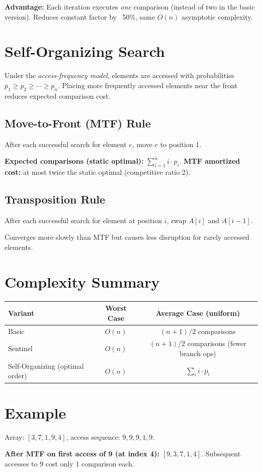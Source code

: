 \documentclass[12pt]{article}
\begin{document}
\textbf{Advantage:} Each iteration executes \emph{one} comparison (instead of two in the basic
version). Reduces constant factor by ~50\%, same $O(n)$ asymptotic complexity.

\section{Self-Organizing Search}

Under the \emph{access-frequency model}, elements are accessed with probabilities
$p_1 \geq p_2 \geq \cdots \geq p_n$. Placing more frequently accessed elements near the front
reduces expected comparison cost.

\subsection*{Move-to-Front (MTF) Rule}
After each successful search for element $e$, move $e$ to position 1.

\textbf{Expected comparisons (static optimal):} $\sum_{i=1}^{n} i \cdot p_i$.
\textbf{MTF amortized cost:} at most twice the static optimal (competitive ratio 2).

\subsection*{Transposition Rule}
After each successful search for element at position $i$, swap $A[i]$ and $A[i-1]$.

Converges more slowly than MTF but causes less disruption for rarely accessed elements.

\section{Complexity Summary}

\begin{center}
\begin{tabular}{lcc}
\toprule
Variant & Worst Case & Average Case (uniform) \\
\midrule
Basic & $O(n)$ & $(n+1)/2$ comparisons \\
Sentinel & $O(n)$ & $(n+1)/2$ comparisons (fewer branch ops) \\
Self-Organizing (optimal order) & $O(n)$ & $\sum_{i} i \cdot p_i$ \\
\bottomrule
\end{tabular}
\end{center}

\section{Example}

Array: $[3, 7, 1, 9, 4]$, access sequence: $9, 9, 9, 1, 9$.

\textbf{After MTF on first access of 9 (at index 4):} $[9, 3, 7, 1, 4]$.
Subsequent accesses to 9 cost only 1 comparison each.
\end{document}
